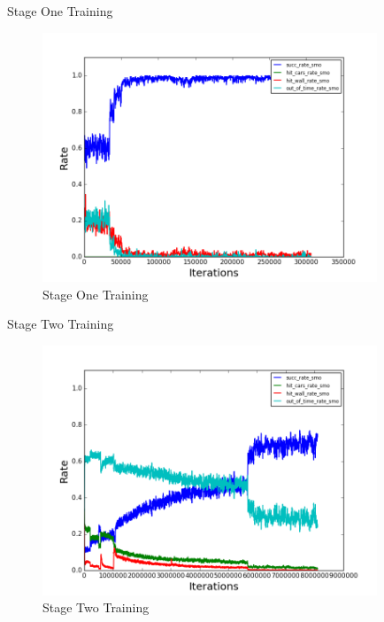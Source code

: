 \documentclass{beamer}
\begin{document}
\begin{frame}{Stage One Training}
\begin{figure}
    \centering
    \includegraphics[width=10cm]{stage_one.png}
    \caption{Stage One Training}
    \label{fig:Stage One Training}
\end{figure} 
\end{frame}

\begin{frame}{Stage Two Training}
\begin{figure}
    \centering
    \includegraphics[width=10cm]{stage_two.png}
    \caption{Stage Two Training}
    \label{fig:Stage Two Training}
\end{figure} 
\end{frame}
\end{document}
